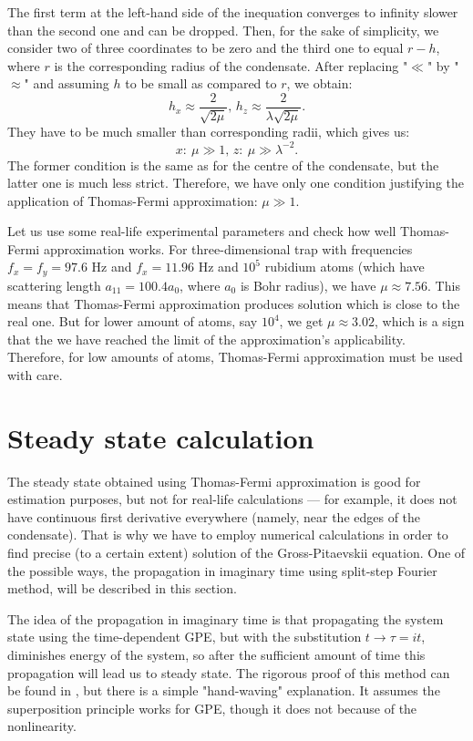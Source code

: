 \documentclass[12pt,notitlepage]{report}
\begin{document}
The first term at the left-hand side of the inequation converges to infinity slower than the second one and can be dropped.
Then, for the sake of simplicity, we consider two of three coordinates to be zero and the third one to equal $r - h$,
where $r$ is the corresponding radius of the condensate.
After replacing "$\ll$" by "$\approx$" and assuming $h$ to be small as compared to $r$, we obtain:
\[ h_x \approx \frac{2}{\sqrt{2 \mu}},\, h_z \approx \frac{2}{\lambda \sqrt{2 \mu}}. \]
They have to be much smaller than corresponding radii, which gives us:
\[ x:\: \mu \gg 1,\, z:\: \mu \gg \lambda^{-2}. \]
The former condition is the same as for the centre of the condensate, but the latter one is much less strict.
Therefore, we have only one condition justifying the application of Thomas-Fermi approximation: $\mu \gg 1$.
 
Let us use some real-life experimental parameters and check how well Thomas-Fermi approximation works.
For three-dimensional trap with frequencies $f_x = f_y = 97.6 \textrm{ Hz}$ and $f_x = 11.96 \textrm{ Hz}$
and $10^5$ rubidium atoms (which have scattering length $a_{11} = 100.4 a_0$, where $a_0$ is Bohr radius),
we have $\mu \approx 7.56$.
This means that Thomas-Fermi approximation produces solution which is close to the real one.
But for lower amount of atoms, say $10^4$, we get $\mu \approx 3.02$,
which is a sign that the we have reached the limit of the approximation's applicability.
Therefore, for low amounts of atoms, Thomas-Fermi approximation must be used with care.

\section*{Steady state calculation}

The steady state obtained using Thomas-Fermi approximation is good for estimation purposes,
but not for real-life calculations --- for example, it does not have continuous first derivative everywhere
(namely, near the edges of the condensate).
That is why we have to employ numerical calculations in order to find precise (to a certain extent) solution
of the Gross-Pitaevskii equation.
One of the possible ways, the propagation in imaginary time using split-step Fourier method, will be described in this section.

The idea of the propagation in imaginary time is that propagating the system state using the time-dependent GPE,
but with the substitution $t \rightarrow \tau = it$, diminishes energy of the system,
so after the sufficient amount of time this propagation will lead us to steady state.
The rigorous proof of this method can be found in \cite{gpe_ngf}, but there is a simple "hand-waving" explanation.
It assumes the superposition principle works for GPE, though it does not because of the nonlinearity.
\end{document}
